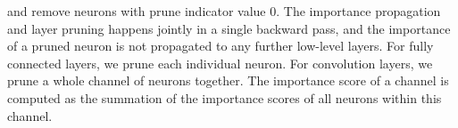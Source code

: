 \documentclass[10pt,twocolumn,letterpaper]{article}
\begin{document}
and remove neurons with prune indicator value $0$. The importance propagation and layer pruning happens jointly in a single backward pass, and the importance of a pruned neuron is not propagated to any further low-level layers. For fully connected layers, we prune each individual neuron. For convolution layers, we prune a whole channel of neurons together. The importance score of a channel is computed as the summation of the importance scores of all neurons within this channel.%
\end{document}
